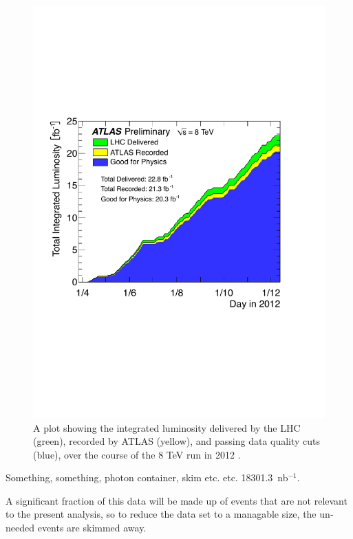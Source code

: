 \begin{english}
\begin{figure}[hbt]
\begin{minipage}[b]{.69\textwidth}
\hspace{-1em}\includegraphics[width=\textwidth]{figures/intlumi}
\end{minipage}\hfill\begin{minipage}[b]{.3\textwidth}
\caption{A plot showing the integrated luminosity delivered by the LHC (green), recorded by ATLAS (yellow), and passing data quality cuts (blue), over the course of the 8 TeV run in 2012 \cite{publiclumi}.
\label{intlumi}}
\end{minipage}
\end{figure}

Something, something, photon container, skim etc. etc. 18301.3~nb$^{-1}$.

A significant fraction of this data will be made up of events that are not relevant to the present analysis, so to reduce the data set to a managable size, the unneeded events are skimmed away.


\end{english}
